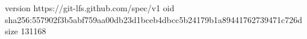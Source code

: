 version https://git-lfs.github.com/spec/v1
oid sha256:557902f3b5abf759aa00db23d1bceb4dbcc5b24179b1a89441762739471c726d
size 131168
